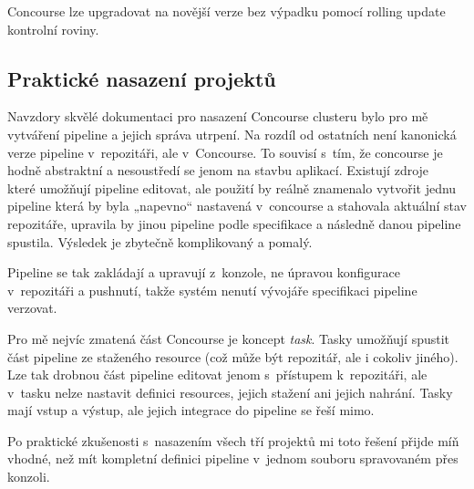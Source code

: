         Concourse lze upgradovat na novější verze bez výpadku pomocí rolling update kontrolní roviny.

    \subsection{Praktické nasazení projektů}
        Navzdory skvělé dokumentaci pro nasazení Concourse clusteru bylo pro mě vytváření pipeline a jejich správa utrpení. Na rozdíl od ostatních \CI není kanonická verze pipeline v~repozitáři, ale v~Concourse. To souvisí s~tím, že concourse je hodně abstraktní a nesoustředí se jenom na stavbu aplikací. Existují zdroje~\cite{concourse-pipeline-res} které umožňují pipeline editovat, ale použití by reálně znamenalo vytvořit jednu pipeline která by byla „napevno“ nastavená v~concourse a stahovala aktuální stav repozitáře, upravila by jinou pipeline podle specifikace a následně danou pipeline spustila. Výsledek je zbytečně komplikovaný a pomalý.

        Pipeline se tak zakládají a upravují z~konzole, ne úpravou konfigurace v~repozitáři a pushnutí, takže systém nenutí vývojáře specifikaci pipeline verzovat.

        Pro mě nejvíc zmatená část Concourse je koncept \textit{task}. Tasky umožňují spustit část pipeline ze staženého resource (což může být repozitář, ale i cokoliv jiného). Lze tak drobnou část pipeline editovat jenom s~přístupem k~repozitáři, ale v~tasku nelze nastavit definici resources, jejich stažení ani jejich nahrání. Tasky mají vstup a výstup, ale jejich integrace do pipeline se řeší mimo.

        Po praktické zkušenosti s~nasazením všech tří projektů mi toto řešení přijde míň vhodné, než mít kompletní definici pipeline v~jednom souboru spravovaném přes konzoli.


